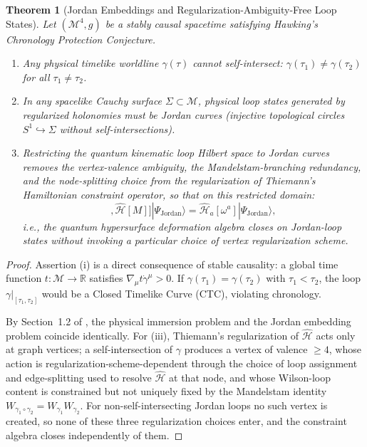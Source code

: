 \documentclass[11pt,a4paper,reqno]{amsart}
\newtheorem{theorem}{Theorem}[section]
\theoremstyle{definition}
\numberwithin{equation}{section}
\providecommand{\R}{\mathbb{R}}
\providecommand{\R}{\mathbb{R}}
\begin{document}
\begin{theorem}[Jordan Embeddings and Regularization-Ambiguity-Free Loop States]
\label{thm:jordan_chronology}
Let $(\mathcal{M}^4, g)$ be a stably causal spacetime satisfying Hawking's Chronology Protection Conjecture.
\begin{enumerate}[label=(\roman*)]
    \item Any physical timelike worldline $\gamma(\tau)$ cannot self-intersect: $\gamma(\tau_1) \neq \gamma(\tau_2)$ for all $\tau_1 \neq \tau_2$.
    \item In any spacelike Cauchy surface $\Sigma \subset \mathcal{M}$, physical loop states generated by regularized holonomies must be \emph{Jordan curves} (injective topological circles $S^1 \hookrightarrow \Sigma$ without self-intersections).
    \item Restricting the quantum kinematic loop Hilbert space to Jordan curves removes the vertex-valence ambiguity, the Mandelstam-branching redundancy, and the node-splitting choice from the regularization of Thiemann's Hamiltonian constraint operator, so that on this restricted domain:
    \begin{equation}
        [\widehat{\mathcal{H}}[N], \widehat{\mathcal{H}}[M]] |\Psi_{\mathrm{Jordan}}\rangle = \widehat{\mathcal{H}}_a[\omega^a] |\Psi_{\mathrm{Jordan}}\rangle,
    \end{equation}
    i.e., the quantum hypersurface deformation algebra closes on Jordan-loop states without invoking a particular choice of vertex regularization scheme.
\end{enumerate}
\end{theorem}
\begin{proof}
Assertion (i) is a direct consequence of stable causality: a global time function $t \colon \mathcal{M} \to \R$ satisfies $\nabla_\mu t \dot{\gamma}^\mu > 0$. If $\gamma(\tau_1) = \gamma(\tau_2)$ with $\tau_1 < \tau_2$, the loop $\gamma|_{[\tau_1, \tau_2]}$ would be a Closed Timelike Curve (CTC), violating chronology.

By Section~1.2 of \cite{silvafilho2026noneuclidean}, the physical immersion problem and the Jordan embedding problem coincide identically. For (iii), Thiemann's regularization of $\widehat{\mathcal{H}}$ acts only at graph vertices; a self-intersection of $\gamma$ produces a vertex of valence $\ge 4$, whose action is regularization-scheme-dependent through the choice of loop assignment and edge-splitting used to resolve $\widehat{\mathcal{H}}$ at that node, and whose Wilson-loop content is constrained but not uniquely fixed by the Mandelstam identity $W_{\gamma_1 \circ \gamma_2} = W_{\gamma_1} W_{\gamma_2}$. For non-self-intersecting Jordan loops no such vertex is created, so none of these three regularization choices enter, and the constraint algebra closes independently of them.
\end{proof}
\end{document}
